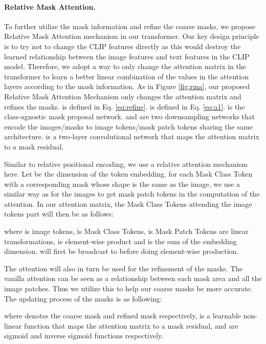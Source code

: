 \documentclass{article}
\theoremstyle{plain}
\theoremstyle{definition}
\theoremstyle{remark}
\begin{document}
\paragraph{Relative Mask Attention.} To further utilize the mask information and refine the coarse masks, we propose Relative Mask Attention mechanism in our transformer. Our key design principle is to try not to change the CLIP features directly as this would destroy the learned relationship between the image features and text features in the CLIP model. Therefore, we adopt a way to only change the attention matrix in the transformer to learn a better linear combination of the values in the attention layers according to the mask information. As in Figure \ref{fig:rma}, our proposed Relative Mask Attention Mechanism only changes the attention matrix and refines the masks.  is defined in Eq. \ref{eq:refine}.  is defined in Eq. \ref{eq:a1}.  is the class-agnostic mask proposal network.  and  are two downsampling networks that encode the images/masks to image tokens/mask patch tokens sharing the same architecture.  is a two-layer convolutional network that maps the attention matrix to a mask residual.

Similar to relative positional encoding, we use a relative attention mechanism here. Let  be the dimension of the token embedding, 
for each Mask Class Token  with a corresponding mask  whose shape is the same as the image, we use a similar way as for the images to get mask patch tokens  in the computation of the attention. In our attention matrix, the Mask Class Tokens attending the image tokens part will then be as follows:

where  is image tokens,  is Mask Class Tokens,  is Mask Patch Tokens  are linear transformations,  is element-wise product and  is the sum of the embedding dimension.  will first be broadcast to  before doing element-wise production.

The attention will also in turn be used for the refinement of the masks. The vanilla attention can be seen as a relationship between each mask area and all the image patches. Thus we utilize this to help our coarse masks be more accurate. The updating process of the masks is as following:

where  denotes the coarse mask and refined mask respectively,  is a learnable non-linear function that maps the attention matrix to a mask residual,  and  are sigmoid and inverse sigmoid functions respectively.
\end{document}
